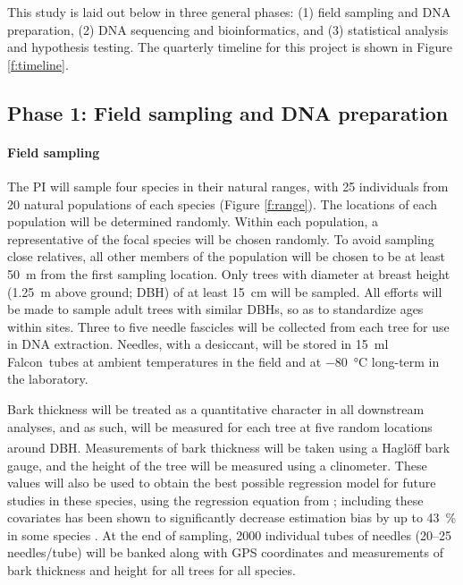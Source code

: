 This study is laid out below in three general phases: (1) field sampling and DNA preparation, (2) DNA sequencing and bioinformatics, 
and (3) statistical analysis and hypothesis testing.  The quarterly timeline for this project is shown in Figure \ref{f:timeline}.

\subsection*{Phase 1: Field sampling and DNA preparation}

\paragraph{Field sampling}

The PI will sample four species in their natural ranges, with 25 individuals from 20 natural populations of each 
species (Figure \ref{f:range}).  The locations of each population will be determined randomly.  Within each population, a representative 
of the focal species will be chosen randomly.  To avoid sampling close relatives, all other members of the population will 
be chosen to be at least \SI{50}{m} from the first sampling location.  Only trees with diameter at breast height (\SI{1.25}{m} 
above ground; DBH) of at least \SI{15}{cm} will be sampled. All efforts will be made to sample adult trees with similar DBHs, 
so as to standardize ages within sites.  Three to five needle fascicles will be collected from each tree for use in DNA 
extraction.  Needles, with a desiccant, will be stored in \SI{15}{\ml} Falcon\texttrademark\ tubes  at ambient 
temperatures in the field and at \SI{-80}{\celsius} long-term in the laboratory.  

Bark thickness will be treated as a quantitative character in all downstream analyses, and as such, will be measured for each tree at five 
random locations around DBH.  Measurements of bark thickness will be taken using a 
Hagl\"{o}ff\textsuperscript{\textregistered} bark gauge, and the height of the tree will be measured using a clinometer.  These values 
will also be used to obtain the best possible regression model for future studies in these species, using the 
regression equation from \citet{Cao:1986th}; including these covariates has been shown to significantly decrease estimation
bias by up to \SI{43}{\percent} in some species \citep{Li:2010bl}.  At the end of sampling, \num{2000} individual tubes of 
needles (20--25 needles/tube) will be banked along with GPS coordinates and measurements of bark thickness and height 
for all trees for all species.

